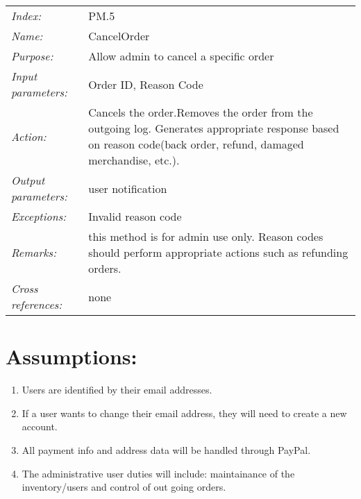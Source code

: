 \documentclass[10pt,letter]{article}
\begin{document}
\begin{tabularx}{\textwidth}{l X}

    \it{Index:} & PM.5 \\

    \it{Name:} & CancelOrder \\

    \it{Purpose:} &  Allow admin to cancel a specific order\\

    \it{Input parameters:} &  Order ID, Reason Code\\

    \it{Action:} & Cancels the order.Removes the order from the outgoing log. Generates appropriate response based on reason code(back order, refund, damaged merchandise, etc.).\\

    \it{Output parameters:} & user notification\\

    \it{Exceptions:} & Invalid reason code\\

    \it{Remarks:} & this method is for admin use only. Reason codes should perform appropriate actions such as refunding orders. \\

    \it{Cross references:} & none\\

    \hline

\end{tabularx}

\section{Assumptions:}
\begin{enumerate}
    \item Users are identified by their email addresses.
    \item If a user wants to change their email address, they will need to create a new account.
    \item All payment info and address data will be handled through PayPal.
    \item The administrative user duties will include: maintainance of the inventory/users and control of out going orders. 
\end{enumerate}
\end{document}
